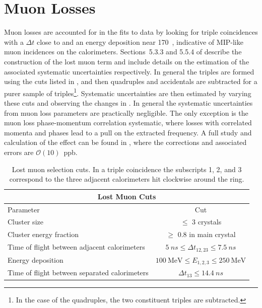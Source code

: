
\graphicspath{{Body/Figures/MuonLosses/}}

\section{Muon Losses}


Muon losses are accounted for in the fits to data by looking for triple coincidences with a $\Delta t$ close to  and an energy deposition near 170~\MeV, indicative of MIP-like muon incidences on the calorimeters. Sections~5.3.3 and 5.5.4 of  describe the construction of the lost muon term and include details on the estimation of the associated systematic uncertainties respectively. In general the triples are formed using the cuts listed in , and then quadruples and accidentals are subtracted for a purer sample of triples\footnote{In the case of the quadruples, the two constituent triples are subtracted.}. Systematic uncertainties are then estimated by varying these cuts and observing the changes in \R. In general the systematic uncertainties from muon loss parameters are practically negligible. The only exception is the muon loss phase-momentum correlation systematic, where losses with correlated momenta and phases lead to a pull on the extracted \wa frequency. A full study and calculation of the effect can be found in , where the corrections and associated errors are $\mathcal{O}(10)$~ppb.



\begin{table}[h]
\centering
\setlength\tabcolsep{10pt}
\renewcommand{\arraystretch}{1.2}
\begin{tabular*}{1\linewidth}{@{\extracolsep{\fill}}lc}
  \hline
    \multicolumn{2}{c}{\textbf{Lost Muon Cuts}} \\
  \hline\hline
    Parameter & Cut \\
  \hline
    Cluster size & $\leq$ 3 crystals \\
    Cluster energy fraction & $\geq$ 0.8 in main crystal \\
    Time of flight between adjacent calorimeters & $\SI{5}{ns} \leq \Delta t_{12, 23} \leq \SI{7.5}{ns}$ \\
    Energy deposition & $\SI{100}{\MeV} \leq E_{1,2,3} \leq \SI{250}{\MeV}$ \\
    Time of flight between separated calorimeters & $\Delta t_{13} \leq \SI{14.4}{ns}$ \\
  \hline 
\end{tabular*}
\caption[Lost muon cuts]{Lost muon selection cuts. In a triple coincidence the subscripts 1, 2, and 3 correspond to the three adjacent calorimeters hit clockwise around the ring.}
\label{tab:lostmuoncuts}
\end{table}



